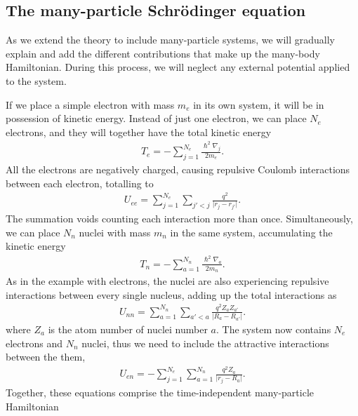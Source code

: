 \subsection{The many-particle Schrödinger equation}
As we extend the theory to include many-particle systems, we will gradually explain and add the different contributions that make up the many-body Hamiltonian. During this process, we will neglect any external potential applied to the system.

If we place a simple electron with mass $m_e$ in its own system, it will be in  possession of kinetic energy. Instead of just one electron, we can place $N_e$ electrons, and they will together have the total kinetic energy
\begin{align}
  T_e = - \sum_{j=1}^{N_e} \frac{\hslash^2\nabla_j}{2m_e}.
\end{align}
All the electrons are negatively charged, causing repulsive Coulomb interactions between each electron, totalling to
\begin{align}
  U_{ee} = \sum_{j=1}^{N_e}\sum_{j'<j} \frac{q^2}{\lvert r_j - r_{j'}\rvert}.
  \label{eq:electron-electron}
\end{align}
The summation voids counting each interaction more than once. Simultaneously, we can place $N_n$ nuclei with mass $m_n$ in the same system, accumulating the kinetic energy
\begin{align}
  T_n = - \sum_{a=1}^{N_n} \frac{\hslash^2\nabla_a}{2m_n}.
\end{align}
As in the example with electrons, the nuclei are also experiencing repulsive interactions between every single nucleus, adding up the total interactions as
\begin{align}
  U_{nn} = \sum_{a=1}^{N_n}\sum_{a'<a} \frac{q^2 Z_aZ_{a'}}{\lvert R_a - R_{a'}\rvert }.
\end{align}
where $Z_a$ is the atom number of nuclei number $a$. The system now contains $N_e$ electrons and $N_n$ nuclei, thus we need to include the attractive interactions between the them,
\begin{align}
  U_{en} = - \sum_{j=1}^{N_e} \sum_{a=1}^{N_n} \frac{q^2Z_a}{\lvert r_j-R_a\rvert}.
\end{align} Together, these equations comprise the time-independent many-particle Hamiltonian
